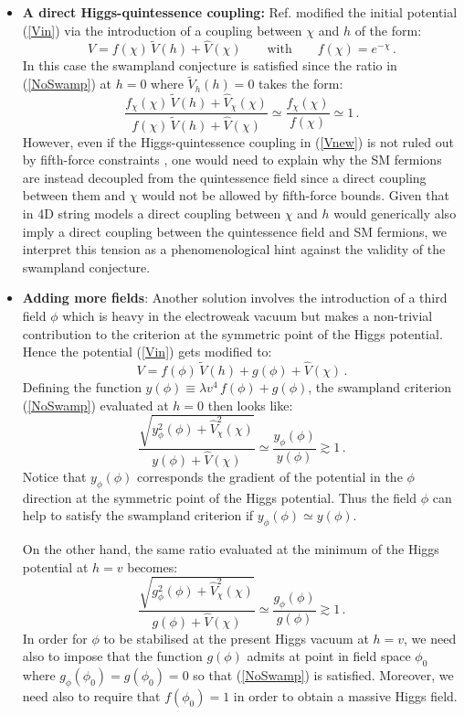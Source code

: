 \documentclass[11pt,a4paper]{article}
\newcommand{\be}{\begin{equation}}
\newcommand{\ee}{\end{equation}}
\begin{document}
\begin{itemize}
\item \textbf{A direct Higgs-quintessence coupling:} Ref. \cite{Denef:2018etk} modified the initial potential (\ref{Vin}) via the introduction of a coupling between $\chi$ and $h$ of the form:
\be
V = f(\chi) \,\tilde{V}(h) + \hat{V} (\chi)\qquad\text{with}\qquad f(\chi) = e^{-\chi} \,.
\label{Vnew}
\ee
In this case the swampland conjecture is satisfied since the ratio in (\ref{NoSwamp}) at $h=0$ where $\tilde{V}_h (h)=0$ takes the form:
\be
\frac{f_\chi(\chi) \,\tilde{V}(h)+\hat{V}_\chi(\chi)}{f(\chi)\,\tilde{V}(h) + \hat{V} (\chi)} \simeq  \frac{f_\chi(\chi)}{f(\chi)} \simeq 1\,.
\label{YesSwamp}
\ee
However, even if the Higgs-quintessence coupling in (\ref{Vnew}) is not ruled out by fifth-force constraints \cite{Denef:2018etk}, one would need to explain why the SM fermions are instead decoupled from the quintessence field since a direct coupling between them and $\chi$ would not be allowed by fifth-force bounds. Given that in 4D string models a direct coupling between $\chi$ and $h$ would generically also imply a direct coupling between the quintessence field and SM fermions, we interpret this tension as a phenomenological hint against the validity of the swampland conjecture. 

\item \textbf{Adding more fields}: Another solution involves the introduction of a third field $\phi$ which is heavy in the electroweak vacuum but makes a non-trivial contribution to the criterion at the symmetric point of the Higgs potential. Hence the potential (\ref{Vin}) gets modified to:
\be
V = f(\phi)\,\tilde{V}(h) + g(\phi) + \hat{V} (\chi)\,.
\label{Vin2}
\ee
Defining the function $y(\phi)\equiv \lambda v^4\,f(\phi) + g(\phi)$, the swampland criterion (\ref{NoSwamp}) evaluated at $h=0$ then looks like:
\be
\frac{\sqrt{y_\phi^2(\phi)+\hat{V}_\chi^2(\chi)}}{y(\phi) + \hat{V} (\chi)} \simeq  \frac{y_\phi(\phi)}{y (\phi)} \gtrsim 1\,.
\label{NoSwamp2}
\ee
Notice that $y_\phi(\phi)$ corresponds the gradient of the potential in the $\phi$ direction at the symmetric point of the Higgs potential. Thus the field $\phi$ can help to satisfy the swampland criterion if $y_\phi(\phi)\simeq y (\phi)$.

On the other hand, the same ratio evaluated at the minimum of the Higgs potential at $h=v$ becomes:
\be
\frac{\sqrt{g_\phi^2(\phi)+\hat{V}_\chi^2(\chi)}}{g(\phi) + \hat{V} (\chi)} \simeq  \frac{g_\phi(\phi)}{g (\phi)} \gtrsim 1\,.
\label{NoSwamp3}
\ee
In order for $\phi$ to be stabilised at the present Higgs vacuum at $h=v$, we need also to impose that the function $g (\phi)$ admits at point in field space $\phi_0$ where $g_\phi(\phi_0) = g (\phi_0) = 0$ so that (\ref{NoSwamp}) is satisfied. Moreover, we need also to require that $f(\phi_0)=1$ in order to obtain a massive Higgs field. 


\end{itemize}
\end{document}
